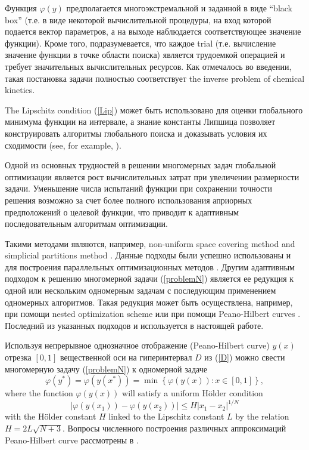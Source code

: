 \documentclass{svproc}
\begin{document}
Функция $\varphi(y)$ предполагается многоэкстремальной и заданной в виде ``black box'' (т.е. в виде некоторой вычислительной процедуры, на вход которой подается вектор параметров, а на выходе наблюдается соответствующее значение функции). Кроме того, подразумевается, что каждое trial (т.е. вычисление значение функции в точке области поиска) является трудоемкой операцией и требует значительных вычислительных ресурсов. Как отмечалось во введении, такая постановка задачи полностью соответствует the inverse problem of chemical kinetics.

The Lipschitz condition (\ref{Lip}) может быть использовано для оценки глобального минимума функции на интервале, а знание константы Липшица позволяет конструировать алгоритмы глобального поиска и доказывать условия их сходимости (see, for example, \cite{Strongin2000}).

Одной из основных трудностей в решении многомерных задач глобальной оптимизации является рост вычислительных затрат при увеличении размерности задачи. Уменьшение числа испытаний функции при сохранении точности решения возможно за счет более полного использования априорных предположений о целевой функции, что приводит к адаптивным последовательным алгоритмам оптимизации.

Такими методами являются, например, non-uniform space covering method \cite{Evtushenko2013} and simplicial partitions method \cite{Zilinskas2010}. Данные подходы были успешно использованы и для построения параллельных оптимизационных методов \cite{Evtushenko2009,Paulavicius2011}. Другим адаптивным подходом к решению многомерной задачи (\ref{problemN}) является ее редукция к одной или нескольким одномерным задачам с последующим применением одномерных алгоритмов. Такая редукция может быть осуществлена, например, при помощи nested optimization scheme \cite{Grishagin2018} или при помощи Peano-Hilbert curves \cite{Barkalov2018}. Последний из указанных подходов и используется в настоящей работе.

Используя непрерывное однозначное отображение (Peano-Hilbert curve) $y(x)$ отрезка $[0,1]$ вещественной оси на гиперинтервал $D$ из (\ref{D}) можно свести многомерную задачу (\ref{problemN}) к одномерной задаче
\[
\varphi(y^\ast)=\varphi(y(x^\ast))=\min{\left\{\varphi(y(x)): x\in[0,1]\right\}},
\]
where the function $\varphi(y(x))$ will satisfy a uniform H{\"o}lder condition
\[
\left|\varphi(y(x_1))-\varphi(y(x_2))\right|\leq H\left|x_1-x_2\right|^{1/N}
\]
with the H{\"o}lder constant $H$ linked to the Lipschitz constant $L$ by the relation $ H=2 L \sqrt{N+3}$.
Вопросы численного построения различных аппроксимаций Peano-Hilbert curve рассмотрены в \cite{Strongin2000,Sergeyev2013}.
\end{document}
